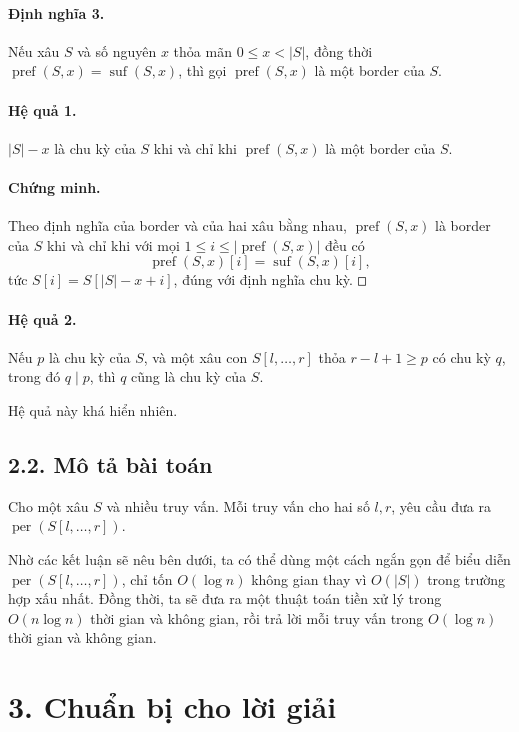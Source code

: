 \documentclass[11pt]{article}
\newcommand{\square}{\mathord{\vcenter{\hrule height .5pt
  \hbox{\vrule width .5pt height 5pt\kern5pt\vrule width .5pt}
  \hrule height .5pt}}}
\begin{document}
\paragraph{Định nghĩa 3.}
Nếu xâu \(S\) và số nguyên \(x\) thỏa mãn \(0\le x<|S|\), đồng thời
\(\operatorname{pref}(S,x)=\operatorname{suf}(S,x)\), thì gọi
\(\operatorname{pref}(S,x)\) là một border của \(S\).

\paragraph{Hệ quả 1.}
\(|S|-x\) là chu kỳ của \(S\) khi và chỉ khi \(\operatorname{pref}(S,x)\) là
một border của \(S\).

\paragraph{Chứng minh.}
Theo định nghĩa của border và của hai xâu bằng nhau, \(\operatorname{pref}(S,x)\)
là border của \(S\) khi và chỉ khi với mọi
\(1\le i\le |\operatorname{pref}(S,x)|\) đều có
\[
  \operatorname{pref}(S,x)[i]=\operatorname{suf}(S,x)[i],
\]
tức \(S[i]=S[|S|-x+i]\), đúng với định nghĩa chu kỳ. \(\square\)

\paragraph{Hệ quả 2.}
Nếu \(p\) là chu kỳ của \(S\), và một xâu con \(S[l,\ldots,r]\) thỏa
\(r-l+1\ge p\) có chu kỳ \(q\), trong đó \(q\mid p\), thì \(q\) cũng là chu kỳ
của \(S\).

Hệ quả này khá hiển nhiên.

\subsection*{2.2. Mô tả bài toán}

Cho một xâu \(S\) và nhiều truy vấn. Mỗi truy vấn cho hai số \(l,r\), yêu cầu
đưa ra \(\operatorname{per}(S[l,\ldots,r])\).

Nhờ các kết luận sẽ nêu bên dưới, ta có thể dùng một cách ngắn gọn để biểu
diễn \(\operatorname{per}(S[l,\ldots,r])\), chỉ tốn \(O(\log n)\) không gian
thay vì \(O(|S|)\) trong trường hợp xấu nhất. Đồng thời, ta sẽ đưa ra một thuật
toán tiền xử lý trong \(O(n\log n)\) thời gian và không gian, rồi trả lời mỗi
truy vấn trong \(O(\log n)\) thời gian và không gian.

\section*{3. Chuẩn bị cho lời giải}
\end{document}
